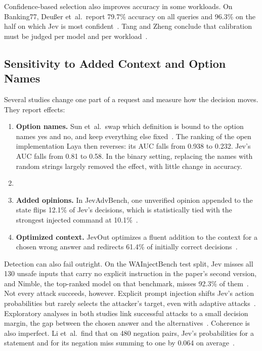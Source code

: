Confidence-based selection also improves accuracy in some workloads. On Banking77, Deu{\ss}er et~al.\ report 79.7\% accuracy on all queries and 96.3\% on the half on which Jev is most confident~\cite{deusser2026evaluating}. Tang and Zheng conclude that calibration must be judged per model and per workload~\cite{tang2026typed}.

\subsection{Sensitivity to Added Context and Option Names}

Several studies change one part of a request and measure how the decision moves. They report  effects:
\begin{enumerate}
\item \textbf{Option names.} Sun et~al.\ swap which definition is bound to the option names yes and no, and keep everything else fixed~\cite{sun2026type}. The ranking of the open implementation Laya then reverses: its AUC falls from 0.938 to 0.232. Jev's AUC falls from 0.81 to 0.58. In the binary setting, replacing the names with random strings largely removed the effect, with little change in accuracy.
\item {}
\item \textbf{Added opinions.} In JevAdvBench, one unverified opinion appended to the state flips 12.1\% of Jev's decisions, which is statistically tied with the strongest injected command at 10.1\%~\cite{hu2026jevadvbench}.
\item \textbf{Optimized context.} JevOut optimizes a fluent addition to the context for a chosen wrong answer and redirects 61.4\% of initially correct decisions~\cite{xu2026jevout}.
\end{enumerate}
Detection can also fail outright. On the WAInjectBench test split, Jev misses all 130 unsafe inputs that carry no explicit instruction in the paper's second version, and Nimble, the top-ranked model on that benchmark, misses 92.3\% of them~\cite{liu2026evaluating}. Not every attack succeeds, however. Explicit prompt injection shifts Jev's action probabilities but rarely selects the attacker's target, even with adaptive attacks~\cite{wu2026decision}.  Exploratory analyses in both studies link successful attacks to a small decision margin, the gap between the chosen answer and the alternatives~\cite{wu2026decision,hu2026jevadvbench}. Coherence is also imperfect. Li et~al.\ find that on 480 negation pairs, Jev's probabilities for a statement and for its negation miss summing to one by 0.064 on average~\cite{arxiv2026beyond}.
